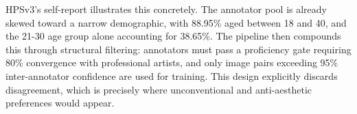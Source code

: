 HPSv3’s self-report illustrates this concretely. The annotator pool is already skewed toward a narrow demographic, with 88.95\% aged between 18 and 40, and the 21-30 age group alone accounting for 38.65\%. The pipeline then compounds this through structural filtering: annotators must pass a proficiency gate requiring 80\% convergence with professional artists, and only image pairs exceeding 95\% inter-annotator confidence are used for training. This design explicitly discards disagreement, which is precisely where unconventional and anti-aesthetic preferences would appear.





